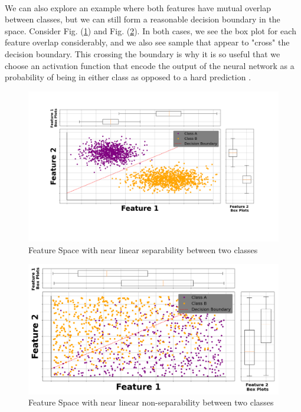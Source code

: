 \documentclass[12pt,letterpaper]{article}
\begin{document}
\paragraph*{}We can also explore an example where both features have mutual overlap between classes, but we can still form a reasonable decision boundary in the space. Consider Fig. (\ref{fig-LinSep2}) and Fig. (\ref{fig-LinNonSep}). In both cases, we see the box plot for each feature overlap considerably, and we also see sample that appear to "cross" the decision boundary. This crossing the boundary is why it is so useful that we choose an activation function that encode the output of the neural network as a probability of being in either class as opposed to a hard prediction \cite{Loy,Geron}.

\begin{figure}[H]
\begin{center}
\includegraphics[scale=0.35]{../MakeFigures/LinearSeparable2}
\end{center}
\caption{Feature Space with near linear separability between two classes}
\label{fig-LinSep2}
\end{figure}

\begin{figure}[H]
\begin{center}
\includegraphics[scale=0.35]{../MakeFigures/LinearNonSeparable}
\end{center}
\caption{Feature Space with near linear non-separability between two classes}
\label{fig-LinNonSep}
\end{figure}
\end{document}
